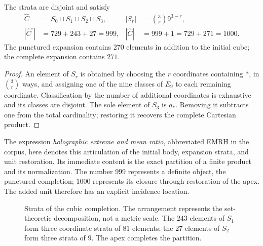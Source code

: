 \begin{proposition}
The strata are disjoint and satisfy
\begin{align}
 \widehat C&=S_0\sqcup S_1\sqcup S_2\sqcup S_3,
 &|S_r|&=\binom3r9^{3-r},\label{vi:cubo:estratos}\\
 |\widehat C^{\circ}|&=729+243+27=999,
 &|\widehat C|&=999+1=729+271=1000.\label{vi:cubo:999}
\end{align}
The punctured expansion contains \(270\) elements in addition to the
initial cube; the complete expansion contains \(271\).
\end{proposition}
\begin{proof}
An element of \(S_r\) is obtained by choosing the \(r\) coordinates
containing \(\ast\), in \(\binom3r\) ways, and assigning one of the
nine classes of \(E_9\) to each remaining coordinate. Classification by
the number of additional coordinates is exhaustive and its classes are
disjoint. The sole element of \(S_3\) is \(a_\ast\). Removing it
subtracts one from the total cardinality; restoring it recovers the
complete Cartesian product.
\end{proof}

The expression \emph{holographic extreme and mean ratio}, abbreviated EMRH
in the corpus, here denotes this articulation of the initial body, expansion
strata, and unit restoration. Its immediate content is the exact partition
of a finite product and its normalization. The number \(999\) represents
a definite object, the punctured completion; \(1000\) represents its
closure through restoration of the apex. The added unit therefore has
an explicit incidence location.

\begin{figure}[htbp]
\centering
{}
\caption{Strata of the cubic completion. The arrangement represents
the set-theoretic decomposition, not a metric scale. The \(243\) elements
of \(S_1\) form three coordinate strata of \(81\) elements; the \(27\)
elements of \(S_2\) form three strata of \(9\). The apex completes the partition.}
\label{vi:cubo:estratos-fig}
\end{figure}

